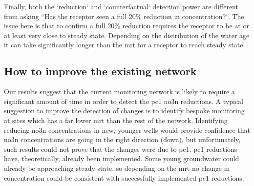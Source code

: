 Finally, both the `reduction` and `counterfactual` detection power are different from asking ``Has the receptor seen a full 20\% reduction in concentration?``. The issue here is that to confirm a full 20\% reduction requires the receptor to be at or at least very close to steady state. Depending on the distribution of the water age it can take significantly longer than the \gls{mrt} for a receptor to reach steady state.

\subsection[network improvements]{How to improve the existing network}

Our results suggest that the current monitoring network is likely to require a significant amount of time in order to detect the \gls{pc1} \gls{no3n} reductions. A typical suggestion to improve the detection of changes is to identify bespoke monitoring at sites which has a far lower \gls{mrt} than the rest of the network. Identifying reducing \gls{no3n} concentrations in new, younger wells would provide confidence that \gls{no3n} concentrations are going in the right direction (down), but unfortunately, such results could not prove that the changes were due to \gls{pc1}. \gls{pc1} reductions have, theoretically, already been implemented. Some young groundwater could already be approaching steady state, so depending on the \gls{mrt} no change in concentration could be consistent with successfully implemented \gls{pc1} reductions.

